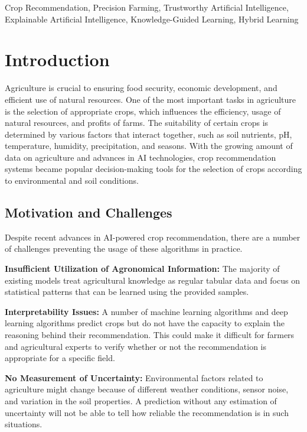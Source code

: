\documentclass[journal]{IEEEtran}
\begin{document}
\begin{IEEEkeywords} 
Crop Recommendation, Precision Farming, Trustworthy Artificial Intelligence, Explainable Artificial Intelligence, Knowledge-Guided Learning, Hybrid Learning
\end{IEEEkeywords}
\section{Introduction}

Agriculture is crucial to ensuring food security, economic development, and efficient use of natural resources. One of the most important tasks in agriculture is the selection of appropriate crops, which influences the efficiency, usage of natural resources, and profits of farms. The suitability of certain crops is determined by various factors that interact together, such as soil nutrients, pH, temperature, humidity, precipitation, and seasons. With the growing amount of data on agriculture and advances in AI technologies, crop recommendation systems became popular decision-making tools for the selection of crops according to environmental and soil conditions.

\subsection{Motivation and Challenges}

Despite recent advances in AI-powered crop recommendation, there are a number of challenges preventing the usage of these algorithms in practice.

\textbf{Insufficient Utilization of Agronomical Information:}
The majority of existing models treat agricultural knowledge as regular tabular data and focus on statistical patterns that can be learned using the provided samples.

\textbf{Interpretability Issues:}
A number of machine learning algorithms and deep learning algorithms predict crops but do not have the capacity to explain the reasoning behind their recommendation. This could make it difficult for farmers and agricultural experts to verify whether or not the recommendation is appropriate for a specific field.

\textbf{No Measurement of Uncertainty:}
Environmental factors related to agriculture might change because of different weather conditions, sensor noise, and variation in the soil properties. A prediction without any estimation of uncertainty will not be able to tell how reliable the recommendation is in such situations.
\end{document}
